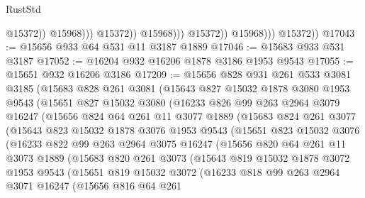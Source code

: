 \begin{lexlean}{RustStd}
\begin{coremodule}
                                      @15372))
                                  @15968)))
                            @15372))
                        @15968)))
                  @15372))
              @15968)))
        @15372))
@17043 := @15656 @933 @64 @531 @11 @3187 @1889
@17046 := @15683 @933 @531 @3187
@17052 := @16204 @932 @16206 @1878 @3186 @1953 @9543
@17055 := @15651 @932 @16206 @3186
@17209 := @15656
    @828
    @931
    @261
    @533
    @3081
    @3185
    (@15683
      @828
      @261
      @3081
      (@15643
        @827
        @15032
        @1878
        @3080
        @1953
        @9543
        (@15651
          @827
          @15032
          @3080
          (@16233
            @826
            @99
            @263
            @2964
            @3079
            @16247
            (@15656
              @824
              @64
              @261
              @11
              @3077
              @1889
              (@15683
                @824
                @261
                @3077
                (@15643
                  @823
                  @15032
                  @1878
                  @3076
                  @1953
                  @9543
                  (@15651
                    @823
                    @15032
                    @3076
                    (@16233
                      @822
                      @99
                      @263
                      @2964
                      @3075
                      @16247
                      (@15656
                        @820
                        @64
                        @261
                        @11
                        @3073
                        @1889
                        (@15683
                          @820
                          @261
                          @3073
                          (@15643
                            @819
                            @15032
                            @1878
                            @3072
                            @1953
                            @9543
                            (@15651
                              @819
                              @15032
                              @3072
                              (@16233
                                @818
                                @99
                                @263
                                @2964
                                @3071
                                @16247
                                (@15656
                                  @816
                                  @64
                                  @261

\end{coremodule}
\end{lexlean}
